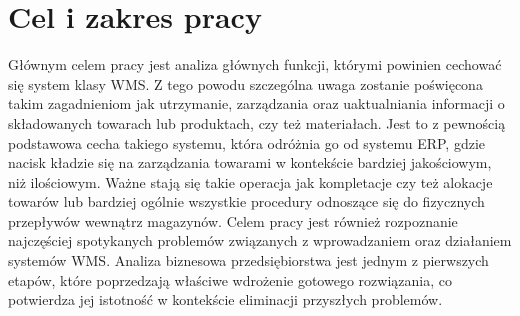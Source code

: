 \section{Cel i zakres pracy}
	Głównym celem pracy jest analiza głównych funkcji, którymi powinien cechować
	się system klasy WMS. Z tego powodu szczególna uwaga zostanie poświęcona takim
	zagadnieniom jak utrzymanie, zarządzania oraz uaktualniania informacji o 
	składowanych towarach lub produktach, czy też materiałach. Jest to z pewnością
	podstawowa cecha takiego systemu, która odróżnia go od systemu ERP, gdzie nacisk
	kładzie się na zarządzania towarami w kontekście bardziej jakościowym, niż
	ilościowym. Ważne stają się takie operacja jak kompletacje czy też alokacje towarów
	lub bardziej ogólnie wszystkie procedury odnoszące się do fizycznych przepływów
	wewnątrz magazynów. 
	Celem pracy jest również rozpoznanie najczęściej spotykanych problemów związanych
	z wprowadzaniem oraz działaniem systemów WMS. Analiza biznesowa przedsiębiorstwa
	jest jednym z pierwszych etapów, które poprzedzają właściwe wdrożenie
	gotowego rozwiązania, co potwierdza jej istotność w kontekście eliminacji przyszłych
	problemów.
	
